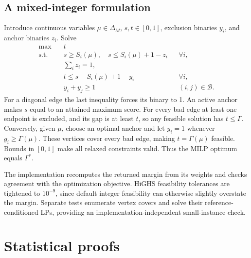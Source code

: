 \documentclass[11pt]{article}
\theoremstyle{definition}\newtheorem{definition}[theorem]{Definition}
\newcommand{\1}{\mathbf{1}}
\newcommand{\bad}{\mathcal B}
\newcommand{\Gam}{\Gamma}
\begin{document}
\subsection{A mixed-integer formulation}
Introduce continuous variables $\mu\in\Delta_M$, $s,t\in[0,1]$, exclusion binaries $y_i$, and anchor binaries $z_i$. Solve
\begin{align*}
 \max\quad &t\\
 \text{s.t.}\quad &s\geq S_i(\mu),\quad s\leq S_i(\mu)+1-z_i&&\forall i,\\
 &\sum_i z_i=1,\\
 &t\leq s-S_i(\mu)+1-y_i&&\forall i,\\
 &y_i+y_j\geq1&&(i,j)\in\bad.
\end{align*}
For a diagonal edge the last inequality forces its binary to 1. An active anchor makes $s$ equal to an attained maximum score. For every bad edge at least one endpoint is excluded, and its gap is at least $t$, so any feasible solution has $t\leq\Gam$. Conversely, given $\mu$, choose an optimal anchor and let $y_i=1$ whenever $g_i\geq\Gam(\mu)$. These vertices cover every bad edge, making $t=\Gam(\mu)$ feasible. Bounds in $[0,1]$ make all relaxed constraints valid. Thus the MILP optimum equals $\Gam^*$.

The implementation recomputes the returned margin from its weights and checks agreement with the optimization objective. HiGHS feasibility tolerances are tightened to $10^{-9}$, since default integer feasibility can otherwise slightly overstate the margin. Separate tests enumerate vertex covers and solve their reference-conditioned LPs, providing an implementation-independent small-instance check.

\section{Statistical proofs}\label{app:box}
\end{document}
